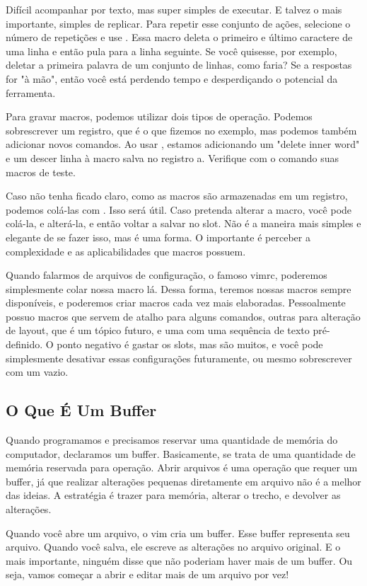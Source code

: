 \documentclass[a4paper, 12pt]{article}
\begin{document}
Difícil acompanhar por texto, mas super simples de executar.
E talvez o mais importante, simples de replicar.
Para repetir esse conjunto de ações, selecione o número de repetições e use .
Essa macro deleta o primeiro e último caractere de uma linha e então pula para a linha seguinte.
Se você quisesse, por exemplo, deletar a primeira palavra de um conjunto de linhas, como faria?
Se a respostas for "à mão", então você está perdendo tempo e desperdiçando o potencial da ferramenta.

Para gravar macros, podemos utilizar dois tipos de operação.
Podemos sobrescrever um registro, que é o que fizemos no exemplo, mas podemos também adicionar novos comandos.
Ao usar , estamos adicionando um "delete inner word" e um descer linha à macro salva no registro a.
Verifique com o comando  suas macros de teste.

Caso não tenha ficado claro, como as macros são armazenadas em um registro, podemos colá-las com .
Isso será útil.
Caso pretenda alterar a macro, você pode colá-la, e alterá-la, e então voltar a salvar no slot.
Não é a maneira mais simples e elegante de se fazer isso, mas é uma forma.
O importante é perceber a complexidade e as aplicabilidades que macros possuem.

Quando falarmos de arquivos de configuração, o famoso vimrc, poderemos simplesmente colar nossa macro lá.
Dessa forma, teremos nossas macros sempre disponíveis, e poderemos criar macros cada vez mais elaboradas.
Pessoalmente possuo macros que servem de atalho para alguns comandos, outras para alteração de layout,
que é um tópico futuro, e uma com uma sequência de texto pré-definido.
O ponto negativo é gastar os slots, mas são muitos, e você pode simplesmente desativar essas configurações
futuramente, ou mesmo sobrescrever com um vazio.

\subsection{O Que É Um Buffer}
Quando programamos e precisamos reservar uma quantidade de memória do computador, declaramos um buffer.
Basicamente, se trata de uma quantidade de memória reservada para operação.
Abrir arquivos é uma operação que requer um buffer, já que realizar alterações pequenas diretamente em arquivo
não é a melhor das ideias.
A estratégia é trazer para memória, alterar o trecho, e devolver as alterações.

Quando você abre um arquivo, o vim cria um buffer.
Esse buffer representa seu arquivo.
Quando você salva, ele escreve as alterações no arquivo original.
E o mais importante, ninguém disse que não poderiam haver mais de um buffer.
Ou seja, vamos começar a abrir e editar mais de um arquivo por vez!
\end{document}
